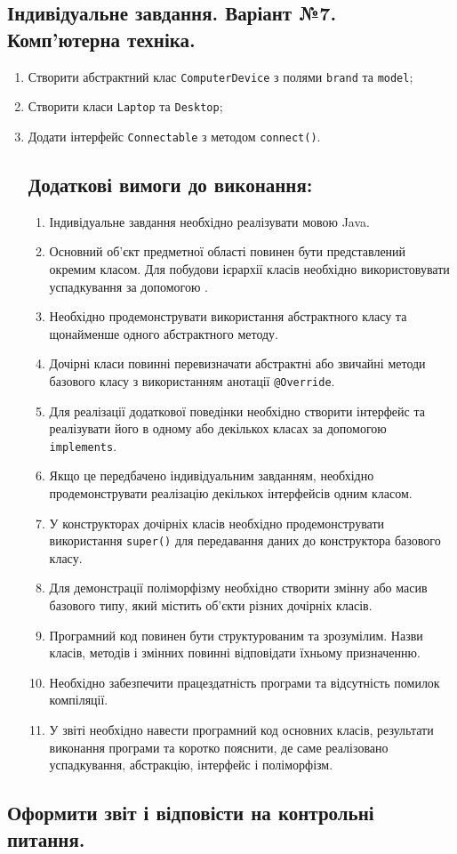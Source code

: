 \subsection{Індивідуальне завдання. Варіант №7. Комп'ютерна техніка.}

\begin{enumerate}
    \item Створити абстрактний клас \texttt{ComputerDevice} з полями \texttt{brand} та \texttt{model};
    \item Створити класи \texttt{Laptop} та \texttt{Desktop};
    \item Додати інтерфейс \texttt{Connectable} з методом \texttt{connect()}.
    
    \subsection{Додаткові вимоги до виконання:}
    \begin{enumerate}
        \item Індивідуальне завдання необхідно реалізувати мовою Java.
        \item Основний об'єкт предметної області повинен бути представлений окремим класом. 
        Для побудови ієрархії класів необхідно використовувати успадкування за допомогою .
        \item Необхідно продемонструвати використання абстрактного класу та щонайменше одного 
        абстрактного методу.
        \item Дочірні класи повинні перевизначати абстрактні або звичайні методи базового 
        класу з використанням анотації \texttt{@Override}.
        \item Для реалізації додаткової поведінки необхідно створити інтерфейс та реалізувати 
        його в одному або декількох класах за допомогою \texttt{implements}.
        \item Якщо це передбачено індивідуальним завданням, необхідно продемонструвати 
        реалізацію декількох інтерфейсів одним класом.
        \item У конструкторах дочірніх класів необхідно продемонструвати використання \texttt{super()} 
        для передавання даних до конструктора базового класу.
        \item Для демонстрації поліморфізму необхідно створити змінну або масив базового 
        типу, який містить об'єкти різних дочірніх класів.
        \item Програмний код повинен бути структурованим та зрозумілим. Назви класів, 
        методів і змінних повинні відповідати їхньому призначенню.
        \item Необхідно забезпечити працездатність програми та відсутність помилок компіляції.
        \item У звіті необхідно навести програмний код основних класів, результати виконання 
        програми та коротко пояснити, де саме реалізовано успадкування, абстракцію, інтерфейс 
        і поліморфізм.
    \end{enumerate}

\end{enumerate}

\subsection{Оформити звіт і відповісти на контрольні питання.}


